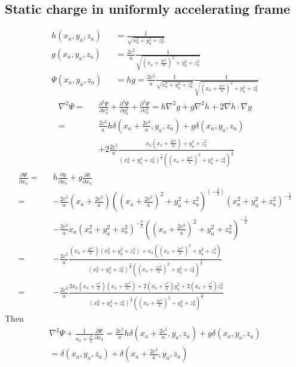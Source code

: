 \documentclass[prd,showpacs,preprint]{revtex4-1}
\begin{document}
\begin{appendix}
\section{Static charge in uniformly accelerating frame\label{app:Psi_Static}}
\begin{eqnarray}
h(x_a,y_a,z_a)&&=\frac{1}{\sqrt{x_a^2 + y_a^2 + z_a^2}}\nonumber\\
g(x_a,y_a,z_a)&&=\frac{2c^2}{a}\frac{1}{\sqrt{(x_a+\frac{2c^2}{a})^2+y_a^2+z_a^2}}\nonumber\\
\Psi(x_a,y_a,z_a)&&=hg=\frac{2c^2}{a}\frac{1}{\sqrt{x_a^2 + y_a^2 + z_a^2}}\frac{1}{\sqrt{(x_a+\frac{2c^2}{a})^2+y_a^2+z_a^2}}
\end{eqnarray}
\begin{eqnarray}
\nabla^2\Psi=&&\frac{\partial^2 \Psi}{\partial x_a^2}+\frac{\partial^2 \Psi}{\partial y_a^2}+\frac{\partial^2 \Psi}{\partial z_a^2} = h\nabla^2 g + g\nabla^2 h + 2\nabla h\cdot\nabla g\nonumber\\
=&&\frac{2c^2}{a}h\delta(x_a+\frac{2c^2}{a},y_a,z_a) + g\delta(x_a,y_a,z_a)\nonumber\\
&&+ 2\frac{2c^2}{a}\frac{x_a(x_a+\frac{2c^2}{a})+y_a^2+z_a^2}{(x_a^2+y_a^2+z_a^2)^{\frac{3}{2}}((x_a+\frac{2c^2}{a})^2+y_a^2+z_a^2)^{\frac{3}{2}}}
\end{eqnarray}
\begin{eqnarray}
\frac{\partial\Psi}{\partial x_a}=&&h\frac{\partial g}{\partial x_a}+g\frac{\partial h}{\partial x_a}\nonumber\\
=&&-\frac{2c^2}{a}(x_a+\frac{2c^2}{a})((x_a+\frac{2c^2}{a})^2+y_a^2+z_a^2)^{(-\frac{3}{2})}(x_a^2+y_a^2+z_a^2)^{-\frac{1}{2}}\nonumber\\
&&-\frac{2c^2}{a}x_a(x_a^2+y_a^2+z_a^2)^{-\frac{3}{2}}((x_a+\frac{2c^2}{a})^2+y_a^2+z_a^2)^{-\frac{1}{2}}\nonumber\\
=&&-\frac{2c^2}{a}\frac{(x_a+\frac{2c^2}{a})(x_a^2+y_a^2+z_a^2)+x_a((x_a+\frac{2c^2}{a})^2+y_a^2+z_a^2)}{(x_a^2+y_a^2+z_a^2)^{\frac{3}{2}}((x_a+\frac{2c^2}{a})^2 + y_a^2+z_a^2)^{\frac{3}{2}}}\nonumber\\
=&&-\frac{2c^2}{a}\frac{2x_a(x_a+\frac{c^2}{a})(x_a+\frac{2c^2}{a}) + 2(x_a+\frac{c^2}{a})y_a^2 + 2(x_a+\frac{c^2}{a})z_a^2}{(x_a^2+y_a^2+z_a^2)^{\frac{3}{2}}((x_a+\frac{2c^2}{a})^2 + y_a^2+z_a^2)^{\frac{3}{2}}}
\end{eqnarray}
Then
\begin{eqnarray}
\nabla^2\Psi + \frac{1}{x_a+\frac{c^2}{a}}\frac{\partial\Psi}{\partial x_a} = \frac{2c^2}{a}h\delta(x_a+\frac{2c^2}{a},y_a,z_a) + g\delta(x_a,y_a,z_a)\nonumber\\
=\delta(x_a,y_a,z_a)+\delta(x_a+\frac{2c^2}{a},y_a,z_a)
\end{eqnarray}


\end{appendix}
\end{document}
